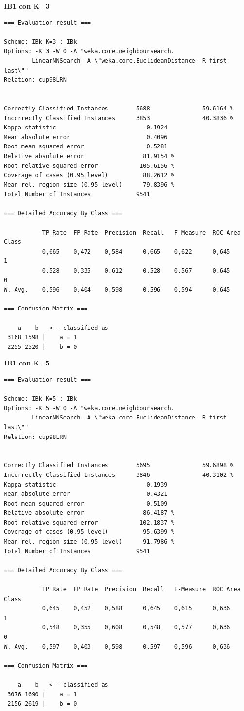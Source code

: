 \textbf{\Large IB1 con K=3}

\begin{verbatim}
=== Evaluation result ===

Scheme: IBk K=3 : IBk
Options: -K 3 -W 0 -A "weka.core.neighboursearch.
        LinearNNSearch -A \"weka.core.EuclideanDistance -R first-last\""
Relation: cup98LRN


Correctly Classified Instances        5688               59.6164 %
Incorrectly Classified Instances      3853               40.3836 %
Kappa statistic                          0.1924
Mean absolute error                      0.4096
Root mean squared error                  0.5281
Relative absolute error                 81.9154 %
Root relative squared error            105.6156 %
Coverage of cases (0.95 level)          88.2612 %
Mean rel. region size (0.95 level)      79.8396 %
Total Number of Instances             9541     

=== Detailed Accuracy By Class ===

           TP Rate  FP Rate  Precision  Recall   F-Measure  ROC Area  Class
           0,665    0,472    0,584      0,665    0,622      0,645     1
           0,528    0,335    0,612      0,528    0,567      0,645     0
W. Avg.    0,596    0,404    0,598      0,596    0,594      0,645     

=== Confusion Matrix ===

    a    b   <-- classified as
 3168 1598 |    a = 1
 2255 2520 |    b = 0
\end{verbatim}

\textbf{\Large IB1 con K=5}

\begin{verbatim}
=== Evaluation result ===

Scheme: IBk K=5 : IBk
Options: -K 5 -W 0 -A "weka.core.neighboursearch.
		LinearNNSearch -A \"weka.core.EuclideanDistance -R first-last\""
Relation: cup98LRN


Correctly Classified Instances        5695               59.6898 %
Incorrectly Classified Instances      3846               40.3102 %
Kappa statistic                          0.1939
Mean absolute error                      0.4321
Root mean squared error                  0.5109
Relative absolute error                 86.4187 %
Root relative squared error            102.1837 %
Coverage of cases (0.95 level)          95.6399 %
Mean rel. region size (0.95 level)      91.7986 %
Total Number of Instances             9541     

=== Detailed Accuracy By Class ===

           TP Rate  FP Rate  Precision  Recall   F-Measure  ROC Area  Class
           0,645    0,452    0,588      0,645    0,615      0,636     1
           0,548    0,355    0,608      0,548    0,577      0,636     0
W. Avg.    0,597    0,403    0,598      0,597    0,596      0,636     

=== Confusion Matrix ===

    a    b   <-- classified as
 3076 1690 |    a = 1
 2156 2619 |    b = 0
\end{verbatim}
\pagebreak

